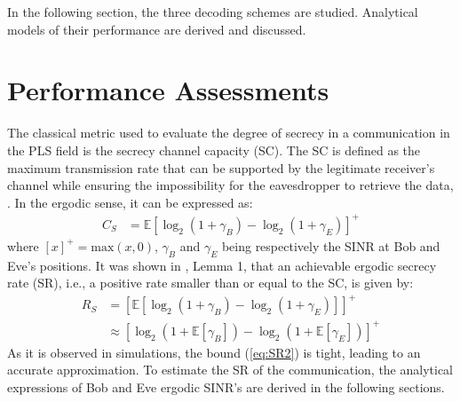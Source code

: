 \documentclass[journal,comsoc]{IEEEtran}
\let\MYoriglatexcaption\caption
\renewcommand{\caption}[2][\relax]{\MYoriglatexcaption[#2]{#2}}
\newcommand{\EX}[1]{\mathbb{E} \left[#1\right]}%
\begin{document}
In the following section, the three decoding schemes are studied. Analytical models of their performance are derived and discussed.




%
%
%










\section{Performance Assessments}
\label{sec:perf}
The classical metric used to evaluate the degree of secrecy in a communication in the PLS field is the secrecy channel capacity (SC). The SC is defined as the maximum transmission rate that can be supported by the legitimate receiver's channel while ensuring the impossibility for the eavesdropper to retrieve the data, \cite{7348007}. In the ergodic sense, it can be expressed as:
\begin{equation}
\begin{split}
C_S &=  \EX{\log_2{\left(1+\gamma_B\right)} - \log_2{\left(1+\gamma_E\right)}}^+ 
\end{split}
\label{eq:SR}
\end{equation}
where $\left[x\right]^+ = \text{max}(x,0)$,  $\gamma_B$ and $\gamma_E$ being respectively the SINR at Bob and Eve's positions.  It was shown in \cite{8418798}, Lemma 1, that an achievable ergodic secrecy rate (SR), i.e., a positive rate smaller than or equal to the SC, is given by:
\begin{equation}
	\begin{split}
		R_S& = \left[\EX{\log_2(1+\gamma_B)-\log_2(1+\gamma_E)}\right]^+ \\
		& \approx \left[ \log_2(1 + \EX{\gamma_B}) - \log_2(1 + \EX{\gamma_E})\right]^+
	\end{split}
	\label{eq:SR2}
\end{equation}
As it is observed in simulations, the bound (\ref{eq:SR2}) is tight, leading to an accurate approximation. To estimate the SR of the communication, the analytical expressions of Bob and Eve ergodic SINR's are derived in the following sections.
\end{document}
